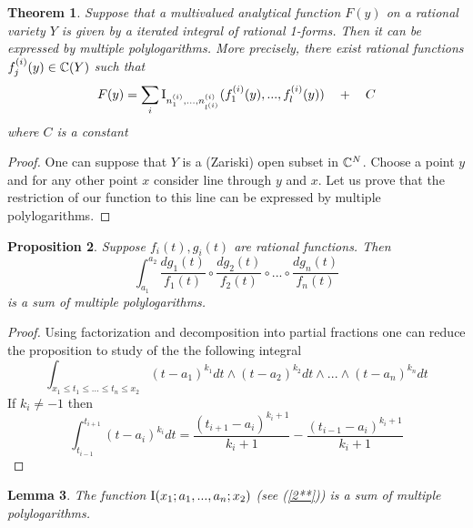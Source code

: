 \documentclass[10pt]{article}
\newtheorem{theorem}{Theorem}[section]
\newtheorem{lemma}[theorem]{Lemma}
\newtheorem{proposition}[theorem]{Proposition}
\begin{document}
 
\begin{theorem} \label{th2.7}
Suppose that a multivalued analytical function $F(y)$ 
on a rational variety $Y$ is given by a  iterated integral of rational 
1-forms. Then it can be expressed by multiple polylogarithms.
More precisely, there exist rational functions $f^{(i)}_j(y) \in {\mathbb C}(Y)$ such that  
$$
F(y) = \sum_i{\rm I}_{n^{(i)}_{1},...,n^{(i)}_{l^{(i)}}}(f^{(i)}_{1}(y),...,
f^{(i)}_{l}(y)) \quad + \quad C
$$
  where $C$ is a constant 
\end{theorem}

 \begin{proof} One can suppose that $Y$ is a (Zariski) open subset in ${\mathbb C}^{N}$. Choose a point $y$ and for any other point $x$ consider line through $y$ and 
$x$. Let us prove that the restriction of our function to this line can be expressed by multiple polylogarithms.

 
\end{proof}

\begin{proposition} \label{p2.8}
  Suppose $f_{i}(t), g_{i}(t)$  are rational functions. Then 
$$
\int_{a_1}^{a_{2}} \frac{dg_{1}(t)}{f_{1}(t)} \circ 
\frac{dg_{2}(t)}{f_{2}(t)} \circ ... \circ \frac{dg_{n}(t)}{f
_{n}(t)} 
$$
is a sum of multiple polylogarithms.
\end{proposition}

 
\begin{proof} Using factorization  and decomposition into 
partial fractions one can reduce the proposition to study of the the following integral
$$
\int_{x_1 \leq 
t_1 \leq ... \leq t_n \leq x_2} (t-a_{1})^{k_1} dt \wedge  (t-a_{2})^{k_2} dt \wedge ... \wedge  
(t-a_{n})^{k_n} dt  
$$
If $k_i \not = -1$ then 
$$
\int_{t_{i-1}}^{t_{i+1}}(t-a_{i})^{k_i} dt = 
\frac{(t_{i+1}-a_{i})^{k_i+1}}{k_i+1} - \frac{(t_{i-1}-a_{i})^{k_i+1}}{k_i+1}
$$ 


\end{proof}

 \begin{lemma}  \label{2.9}  The function ${\rm I}(x_1; a_1, ..., a_n; x_2)$ (see (\ref{2**})) 
is a sum of multiple polylogarithms. 
\end{lemma}
\end{document}
